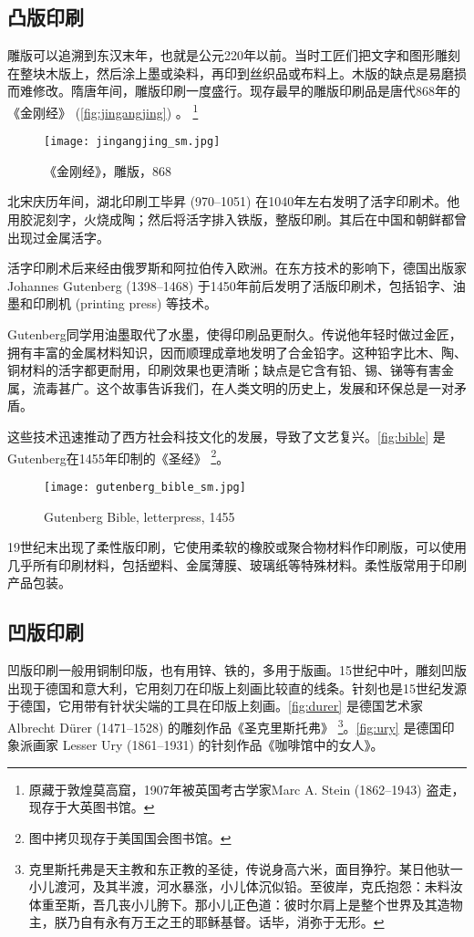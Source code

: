 \subsection{凸版印刷}

雕版可以追溯到东汉末年，也就是公元220年以前。当时工匠们把文字和图形雕刻在整块木版上，然后涂上墨或染料，再印到丝织品或布料上。木版的缺点是易磨损而难修改。隋唐年间，雕版印刷一度盛行。现存最早的雕版印刷品是唐代868年的《金刚经》 (\autoref{fig:jingangjing}) 。 \footnote{原藏于敦煌莫高窟，1907年被英国考古学家Marc A. Stein (1862--1943) 盗走，现存于大英图书馆。}

\begin{figure}[htbp]
\centering
\texttt{[image: jingangjing\_sm.jpg]}
\caption{《金刚经》，雕版，868}
\label{fig:jingangjing}
\end{figure}

北宋庆历年间，湖北印刷工毕昇 (970--1051)\indexBiSheng{} 在1040年左右发明了活字印刷术。他用胶泥刻字，火烧成陶；然后将活字排入铁版，整版印刷。其后在中国和朝鲜都曾出现过金属活字。

活字印刷术后来经由俄罗斯和阿拉伯传入欧洲。在东方技术的影响下，德国出版家Johannes Gutenberg (1398--1468)\indexGutenberg{} 于1450年前后发明了活版印刷术，包括铅字、油墨和印刷机 (printing press) 等技术。

Gutenberg同学用油墨取代了水墨，使得印刷品更耐久。传说他年轻时做过金匠，拥有丰富的金属材料知识，因而顺理成章地发明了合金铅字。这种铅字比木、陶、铜材料的活字都更耐用，印刷效果也更清晰；缺点是它含有铅、锡、锑等有害金属，流毒甚广。这个故事告诉我们，在人类文明的历史上，发展和环保总是一对矛盾。

这些技术迅速推动了西方社会科技文化的发展，导致了文艺复兴。\autoref{fig:bible} 是Gutenberg在1455年印制的《圣经》 \footnote{图中拷贝现存于美国国会图书馆。}。

\begin{figure}[htbp]
\centering
\texttt{[image: gutenberg\_bible\_sm.jpg]}
\caption{Gutenberg Bible, letterpress, 1455}
\label{fig:bible}
\end{figure}

19世纪末出现了柔性版印刷，它使用柔软的橡胶或聚合物材料作印刷版，可以使用几乎所有印刷材料，包括塑料、金属薄膜、玻璃纸等特殊材料。柔性版常用于印刷产品包装。

\subsection{凹版印刷}

凹版印刷一般用铜制印版，也有用锌、铁的，多用于版画。15世纪中叶，雕刻凹版出现于德国和意大利，它用刻刀在印版上刻画比较直的线条。针刻也是15世纪发源于德国，它用带有针状尖端的工具在印版上刻画。\autoref{fig:durer} 是德国艺术家 Albrecht Dürer (1471--1528)\indexDurer{} 的雕刻作品《圣克里斯托弗》 \footnote{克里斯托弗是天主教和东正教的圣徒，传说身高六米，面目狰狞。某日他驮一小儿渡河，及其半渡，河水暴涨，小儿体沉似铅。至彼岸，克氏抱怨：未料汝体重至斯，吾几丧小儿胯下。那小儿正色道：彼时尔肩上是整个世界及其造物主，朕乃自有永有万王之王的耶稣基督。话毕，消弥于无形。}。\autoref{fig:ury} 是德国印象派画家 Lesser Ury (1861--1931)\indexUry{} 的针刻作品《咖啡馆中的女人》。

